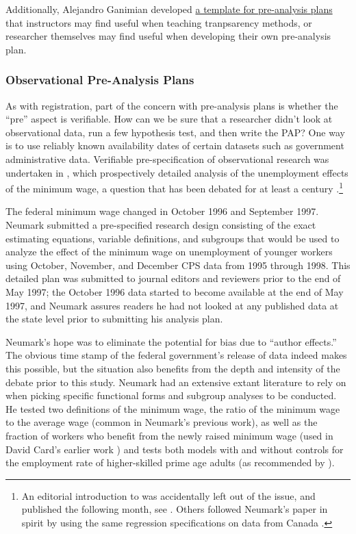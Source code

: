 \documentclass[12pt] {article}
\begin{document}
Additionally, Alejandro Ganimian developed \href{http://scholar.harvard.edu/files/alejandro_ganimian/files/pre-analysis_plan_template_0.pdf}{a template for pre-analysis plans} that instructors may find useful when teaching tranpsarency methods, or researcher themselves may find useful when developing their own pre-analysis plan.

\subsubsection{Observational Pre-Analysis Plans}
As with registration, part of the concern with pre-analysis plans is whether the ``pre'' aspect is verifiable. How can we be sure that a researcher didn't look at observational data, run a few hypothesis test, and then write the PAP? One way is to use reliably known availability dates of certain datasets such as government administrative data. Verifiable pre-specification of observational research was undertaken in \cite{neumark_employment_2001}, which prospectively detailed analysis of the unemployment effects of the minimum wage, a question that has been debated for at least a century \citep{Neumark_2014_bathwater}.\footnote{An editorial introduction to \cite{neumark_employment_2001} was accidentally left out of the issue, and published the following month, see \cite{Levine2001editorial}. Others followed Neumark's paper in spirit by using the same regression specifications on data from Canada \citep{CanadianMinWage2006}.} 

The federal minimum wage changed in October 1996 and September 1997. Neumark submitted a pre-specified research design consisting of the exact estimating equations, variable definitions, and subgroups that would be used to analyze the effect of the minimum wage on unemployment of younger workers using October, November, and December CPS data from 1995 through 1998. This detailed plan was submitted to journal editors and reviewers prior to the end of May 1997; the October 1996 data started to become available at the end of May 1997, and Neumark assures readers he had not looked at any published data at the state level prior to submitting his analysis plan. 

Neumark's hope was to eliminate the potential for bias due to ``author effects.'' The obvious time stamp of the federal government’s release of data indeed makes this possible, but the situation also benefits from the depth and intensity of the debate prior to this study. Neumark had an extensive extant literature to rely on when picking specific functional forms and subgroup analyses to be conducted. He tested two definitions of the minimum wage, the ratio of the minimum wage to the average wage (common in Neumark's previous work), as well as the fraction of workers who benefit from the newly raised minimum wage (used in David Card's earlier work \citep{Card1992minwage}) and tests both models with and without controls for the employment rate of higher-skilled prime age adults (as recommended by \cite{Deere1995minwage}). 
\end{document}
